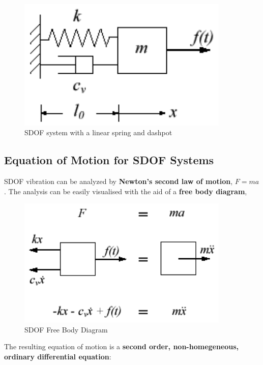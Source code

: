 \documentclass[10pt,b5paper,titlepage]{book}
\begin{document}
\begin{figure}[ht]
    \centering
    \includegraphics[width=0.90\textwidth]{img/SDOF_plot.png}
    \caption{SDOF system with a linear spring and dashpot}
    \label{fig:SDOF-plot-png}
\end{figure}

\subsection{Equation of Motion for SDOF Systems}

SDOF vibration can be analyzed by \textbf{Newton's second law of motion},
$ F = m a $. The analysis can be easily visualised with the aid of a
\textbf{free body diagram},

\begin{figure}[ht]
    \centering
    \includegraphics[width=0.90\textwidth]{img/SDOF_FreeBodyDiagram.png}
    \caption{SDOF Free Body Diagram}
    \label{fig:SDOF-freebodydiagram-png}
\end{figure}

The resulting equation of motion is a
\textbf{second order, non-homegeneous, ordinary differential equation}:
\end{document}
